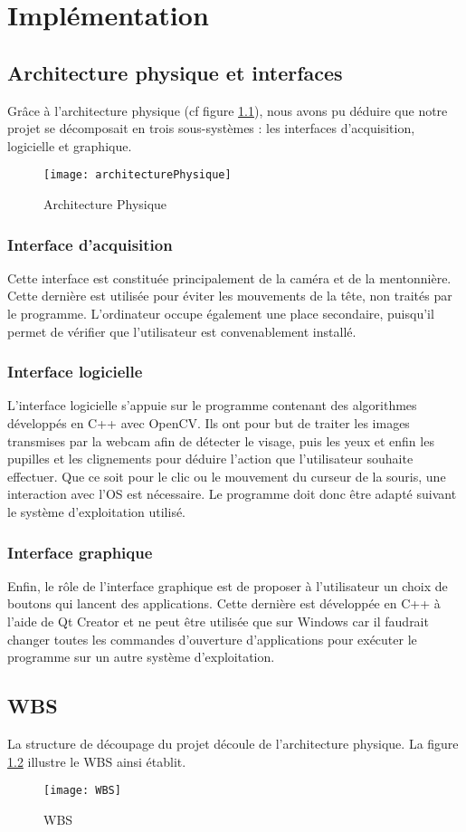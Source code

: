 \chapter{Implémentation}

\section{Architecture physique et interfaces}

Grâce à l'architecture physique (cf figure \ref{fig:archiPhysique}), nous avons pu déduire que notre projet se décomposait en trois sous-systèmes : les interfaces d'acquisition, logicielle et graphique.

\begin{figure}[H]
  \centering
  \texttt{[image: architecturePhysique]}
  \caption{Architecture Physique}
  \label{fig:archiPhysique}
\end{figure}

\subsection{Interface d'acquisition}
Cette interface est constituée principalement de la caméra et de la mentonnière. Cette dernière est utilisée pour éviter les mouvements de la tête, non traités par le programme. L'ordinateur occupe également une place secondaire, puisqu'il permet de vérifier que l'utilisateur est convenablement installé.

\subsection{Interface logicielle}
L'interface logicielle s'appuie sur le programme contenant des algorithmes développés en C++ avec OpenCV. Ils ont pour but de traiter les images transmises par la webcam afin de détecter le visage, puis les yeux et enfin les pupilles et les clignements pour déduire l'action que l'utilisateur souhaite effectuer. Que ce soit pour le clic ou le mouvement du curseur de la souris, une interaction avec l'OS est nécessaire. Le programme doit donc être adapté suivant le système d'exploitation utilisé.

\subsection{Interface graphique}
Enfin, le rôle de l'interface graphique est de proposer à l'utilisateur un choix de boutons qui lancent des applications. Cette dernière est développée en C++ à l'aide de Qt Creator et ne peut être utilisée que sur Windows car il faudrait changer toutes les commandes d'ouverture d'applications pour exécuter le programme sur un autre système d'exploitation.

\section{WBS}
La structure de découpage du projet découle de l'architecture physique. La figure \ref{fig:WBS} illustre le WBS ainsi établit. 

\begin{figure}[H]
  \centering
  \texttt{[image: WBS]}
  \caption{WBS}
  \label{fig:WBS}
\end{figure}